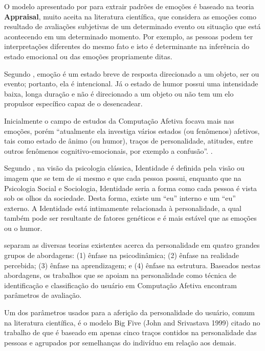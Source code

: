\documentclass[
	12pt,				    %
	openright,			    %
	oneside,			    %
	a4paper,			    %
    sumario=tradicional,    %
	english,			    %
	brazil,				    %
	]{abntex2}              %
\begin{document}
O modelo apresentado por  para extrair padrões de emoções é baseado na teoria \textbf{Appraisal}, muito aceita na literatura científica, que considera as emoções como resultado de avaliações subjetivas de um determinado evento ou situação que está acontecendo em um determinado momento. Por exemplo, as pessoas podem ter interpretações diferentes do mesmo fato e isto é determinante na inferência do estado emocional ou das emoções propriamente ditas.

Segundo , emoção é um estado breve de resposta direcionado a um objeto, ser ou evento; portanto, ela é intencional. Já o estado de humor possui uma intensidade baixa, longa duração e não é direcionado a um objeto ou não tem um elo propulsor específico capaz de o desencadear. 

Inicialmente o campo de estudos da Computação Afetiva focava mais nas emoções, porém ``atualmente ela investiga vários estados (ou fenômenos) afetivos, tais como estado de ânimo (ou humor), traços de personalidade, atitudes, entre outros fenômenos cognitivo-emocionais, por exemplo a confusão''. \cite{Jaques2019}. 

Segundo , na visão da psicologia clássica, Identidade é definida pela visão ou imagem que se tem de si mesmo e que cada pessoa possui, enquanto que na Psicologia Social e Sociologia, Identidade seria a forma como cada pessoa é vista sob os olhos da sociedade. Desta forma, existe um ``eu'' interno e um ``eu'' externo. A Identidade está intimamente relacionada à personalidade, a qual também pode ser resultante de fatores genéticos e é mais estável que as emoções ou o humor.

 separam as diversas teorias existentes acerca da personalidade em quatro grandes grupos de abordagens: (1) ênfase na psicodinâmica; (2) ênfase na realidade percebida; (3) ênfase na aprendizagem; e (4) ênfase na estrutura. Baseados nestas abordagens, os trabalhos que se apoiam na personalidade como técnica de identificação e classificação do usuário em Computação Afetiva encontram parâmetros de avaliação.

Um dos parâmetros usados para a aferição da personalidade do usuário, comum na literatura científica, é o modelo Big Five (John and Srivastava 1999) citado no trabalho de  que é baseado em apenas cinco traços contidos na personalidade das pessoas e agrupados por semelhanças do indivíduo em relação aos demais.
\end{document}
